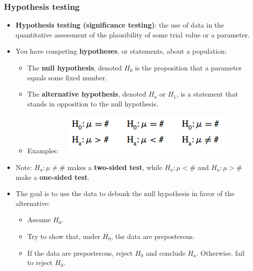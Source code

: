 \documentclass[handout]{beamer}\usepackage[]{graphicx}\usepackage[]{color}
\providecommand{\q}{$\quad$ \newline}
\numberwithin{equation}{section}
\begin{document}
\begin{frame}
\frametitle{Hypothesis testing} \scriptsize
\begin{itemize}
\item {\bf Hypothesis testing (significance testing)}: the use of data in the quantitative assessment of the plausibility of some trial value or a parameter. 
\pause \item You have competing {\bf hypotheses}, or statements, about a population:
\begin{itemize}
\pause \item The {\bf null hypothesis}, denoted $H_0$ is the proposition that a parameter equals some fixed number.
\pause \item The {\bf alternative hypothesis}, denoted $H_a$ or $H_1$, is a statement that stands in opposition to the null hypothesis.
\pause \item Examples:\q
{} \includegraphics{../../fig/examplehypotheses.png}
\end{itemize}
\pause \item Note: $H_a: \mu \ne \#$ makes a {\bf two-sided test}, while $H_a: \mu < \#$ and $H_a: \mu > \#$ make a {\bf one-sided test}.
\pause \item The goal is to use the data to debunk the null hypothesis in favor of the alternative:
\begin{itemize}
\pause \item Assume $H_0$.
\pause \item Try to show that, under $H_0$, the data are preposterous.
\pause \item If the data are preposterous, reject $H_0$ and conclude $H_a$. Otherwise, fail to reject $H_0$.
\end{itemize}
\end{itemize}
\end{frame}
\end{document}
